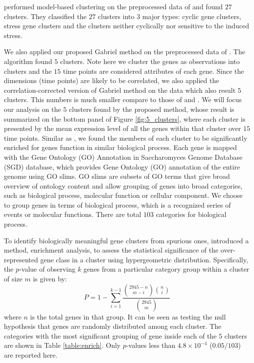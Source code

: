 \documentclass[12pt]{article}
\begin{document}
\cite{dortet2008model} performed model-based clustering on the preprocessed data of \cite{tavazoie1999systematic} and  found $27$ clusters. They classified the $27$ clusters into $3$ major types: cyclic gene clusters, stress gene clusters and the clusters neither cyclically nor sensitive to the induced stress. 

We also applied our proposed Gabriel method on the preprocessed data of \cite{tavazoie1999systematic}. The algorithm found $5$ clusters. Note here we cluster the genes as observations into clusters and the $15$ time points are considered attributes of each gene. Since the dimensions (time points) are likely to be correlated, we also applied the correlation-corrected version of Gabriel method on the data which also result $5$ clusters. This numbers is much smaller compare to those of \cite{tavazoie1999systematic} and \cite{dortet2008model}. We will focus our analysis on the $5$ clusters found by the proposed method, whose result is summarized on the bottom panel of Figure \ref{fig:5_clusters}, where each cluster is presented by the mean expression level of all the genes within that cluster over $15$ time points. Similar as \cite{tavazoie1999systematic}, we found the members of each cluster to be significantly enriched for genes function in similar biological process. Each gene is mapped with the Gene Ontology (GO) Annotation in Saccharomyces Genome Database (SGD) database, which provides Gene Ontology (GO) annotation of the entire genome using GO slims. GO slims are subsets of GO terms that give broad overview of ontology content and allow grouping of genes into broad categories, such as biological process, molecular function or cellular component. We choose to group genes in terms of biological process, which is a recognized series of events or molecular functions. There are total $103$ categories for biological process.

To identify biologically meaningful gene clusters from spurious ones, \cite{tavazoie1999systematic} introduced a method, enrichment analysis, to assess the statistical significance of the over-represented gene class in a cluster using hypergeometric distribution. Specifically, the $p$-value of observing $k$ genes from a particular category group within a cluster of size $m$ is given by:
\[	P = 1-\sum^{k-1}_{i=1} \frac{{{2945-n}\choose{m-i}}{{n}\choose{i}} }{ {{2945} \choose{m}} }\] 
where $n$ is the total genes in that group. It can be seen as testing the null hypothesis that genes are randomly  distributed among each cluster. The categories with the most significant grouping of gene inside each of the $5$ clusters are shown in Table \ref{table:enrich}. Only $p$-values less than $4.8\times10^{-4}$ ($0.05/103$) are reported here. 
\end{document}
